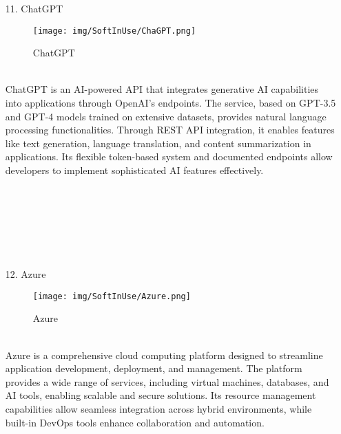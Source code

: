 \documentclass[conference]{IEEEtran}
\begin{document}
\begin{enumerate}
\item[11.] ChatGPT
\begin{figure}[h]
\hspace{1.5cm}
\centering
\begin{minipage}{0.4\columnwidth}
    \texttt{[image: img/SoftInUse/ChaGPT.png]}
    \caption{ChatGPT}
\end{minipage}
\end{figure}\\
ChatGPT is an AI-powered API that integrates generative AI capabilities into applications through OpenAI's endpoints. The service, based on GPT-3.5 and GPT-4 models trained on extensive datasets, provides natural language processing functionalities. Through REST API integration, it enables features like text generation, language translation, and content summarization in applications. Its flexible token-based system and documented endpoints allow developers to implement sophisticated AI features effectively.\\ \\ \\ \\ \\ \\ \\

\item[12.] Azure
\begin{figure}[h]
\hspace{1.5cm}
\centering
\begin{minipage}{0.7\columnwidth}
    \texttt{[image: img/SoftInUse/Azure.png]}
    \caption{Azure}
\end{minipage}
\end{figure} \\
Azure is a comprehensive cloud computing platform designed to streamline application development, deployment, and management. The platform provides a wide range of services, including virtual machines, databases, and AI tools, enabling scalable and secure solutions. Its resource management capabilities allow seamless integration across hybrid environments, while built-in DevOps tools enhance collaboration and automation. \\ 


\end{enumerate}
\end{document}
